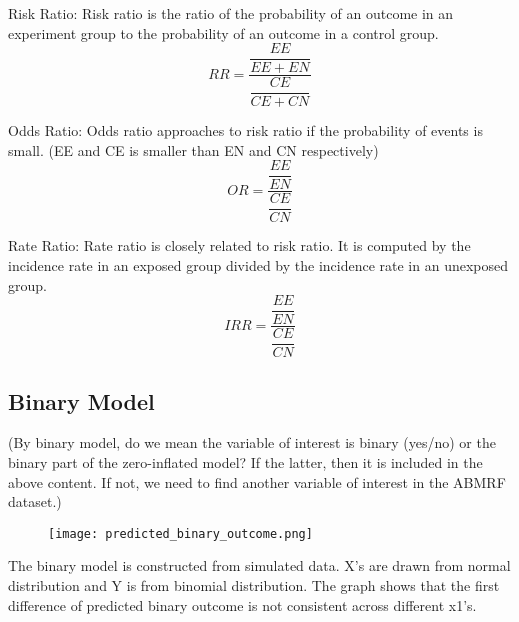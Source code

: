 \documentclass[jou, apacite]{apa6}
\begin{document}

Risk Ratio: Risk ratio is the ratio of the probability of an outcome in an experiment group to the probability of an outcome in a control group.\\
\begin{equation}
RR = \dfrac{\dfrac{EE}{EE + EN }}{\dfrac{CE}{CE + CN}}
\end{equation}

Odds Ratio: Odds ratio approaches to risk ratio if the probability of events is small. (EE and CE is smaller than EN and CN respectively)\\
\begin{equation}
OR = \dfrac{\dfrac{EE}{EN}}{\dfrac{CE}{CN}}
\end{equation}

Rate Ratio: Rate ratio is closely related to risk ratio. It is computed by the incidence rate in an exposed group divided by the incidence rate in an unexposed group. \\
\begin{equation}
IRR = \dfrac{\dfrac{EE}{EN}}{\dfrac{CE}{CN}}
\end{equation}

\subsection{Binary Model}
(By binary model, do we mean the variable of interest is binary (yes/no) or the binary part of the zero-inflated model? If the latter, then it is included in the above content. If not, we need to find another variable of interest in the ABMRF dataset.)

\begin{figure}[h]
\texttt{[image: predicted\_binary\_outcome.png]}
\end{figure}

The binary model is constructed from simulated data. X's are drawn from normal distribution and Y is from binomial distribution. The graph shows that the first difference of predicted binary outcome is not consistent across different x1's. 
\end{document}
